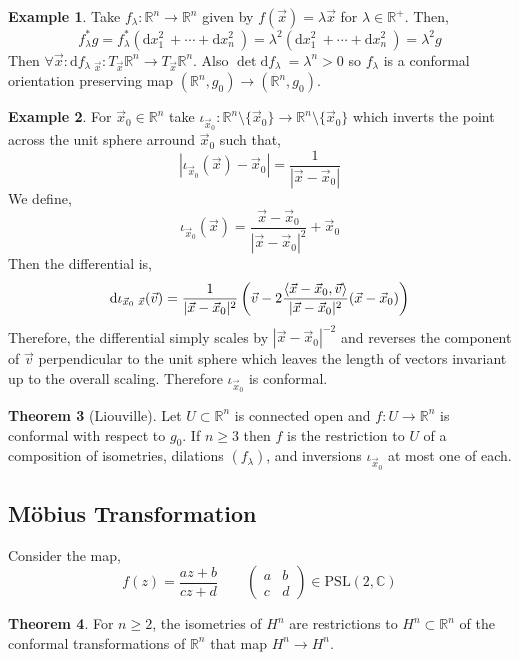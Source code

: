 \documentclass[12pt]{extarticle}
\newcommand{\R}{\mathbb{R}}
\renewcommand{\d}[1]{ \mathrm{d}#1 \:}
\theoremstyle{definition}
\newtheorem{theorem}{Theorem}[section]
\newtheorem{example}[theorem]{Example}
\newcommand{\PSL}[1]{\mathrm{PSL}\left(#1\right)}
\begin{document}
\begin{example}
Take $f_\lambda : \R^n \to \R^n$ given by $f(\vec{x}) = \lambda \vec{x}$ for $\lambda \in \R^+$. Then,
\[ f^*_\lambda g = f^*_\lambda (\d{x_1^2} + \cdots + \d{x_n^2}) = \lambda^2 (\d{x_1^2} + \cdots + \d{x_n^2}) = \lambda^2 g \]
Then $\forall \vec{x} : \d{f_\lambda}_{\vec{x}} : T_{\vec{x}} \R^n \to T_{\vec{x}} \R^n$. Also $\det{\d{f_\lambda}} = \lambda^n > 0$ so $f_\lambda$ is a conformal orientation preserving map $(\R^n, g_0) \to (\R^n, g_0)$.
\end{example}

\begin{example}
For $\vec{x}_0 \in \R^n$ take $\iota_{\vec{x}_0} : \R^n \setminus \{\vec{x}_0\} \to \R^n \setminus \{ \vec{x}_0 \}$ which inverts the point across the unit sphere arround $\vec{x}_0$ such that,
\[ |\iota_{\vec{x}_0}(\vec{x}) - \vec{x}_0| = \frac{1}{|\vec{x} - \vec{x}_0|} \]
We define,
\[ \iota_{\vec{x}_0}(\vec{x}) = \frac{\vec{x} - \vec{x}_0}{|\vec{x} - \vec{x}_0|^2} + \vec{x}_0 \]
Then the differential is,
\[ \d{\iota_{\vec{x}_0}}_{\vec{x}}(\vec{v}) = \frac{1}{|\vec{x} - \vec{x}_0|^2} \left( \vec{v} - 2 \frac{\inner{\vec{x} - \vec{x}_0}{\vec{v}}}{|\vec{x} - \vec{x}_0|^2} (\vec{x} - \vec{x}_0) \right) \]
Therefore, the differential simply scales by $|\vec{x} - \vec{x}_0|^{-2}$ and reverses the component of $\vec{v}$ perpendicular to the unit sphere which leaves the length of vectors invariant up to the overall scaling. Therefore $\iota_{\vec{x}_0}$ is conformal. 
\end{example}

\begin{theorem}[Liouville]
Let $U \subset \R^n$ is connected open and $f : U \to \R^n$ is conformal with respect to $g_0$. If $n \ge 3$ then $f$ is the restriction to $U$ of a composition of isometries, dilations $(f_\lambda)$, and inversions $\iota_{\vec{x}_0}$ at most one of each.
\end{theorem}

\subsection{M\"{o}bius Transformation}

Consider the map,
\[ f(z) = \frac{az + b}{cz + d} \quad \quad 
\begin{pmatrix}
a & b
\\
c & d
\end{pmatrix}
\in \PSL{2, \mathbb{C}} \]


\begin{theorem}
For $n \ge 2$, the isometries of $H^n$ are restrictions to $H^n \subset \R^n$ of the conformal transformations of $\R^{n}$ that map $H^n \to H^n$. 
\end{theorem}
\end{document}
